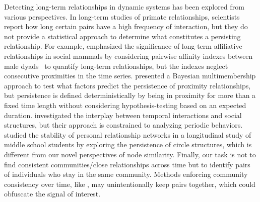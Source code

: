 \documentclass{article}
\theoremstyle{plain}
\theoremstyle{definition}
\theoremstyle{remark}
\begin{document}
Detecting long-term relationships in dynamic systems has been explored from various perspectives. In long-term studies of primate relationships, scientists report how long certain pairs have a high frequency of interaction, but they do not provide a statistical approach to determine what constitutes a persisting relationship. For example,  \citet{mitani2009male} emphasized the significance of long-term affiliative relationships in social mammals by considering pairwise affinity indexes between male dyads~\cite{pepper1999general} to quantify long-term relationships, but the indexes neglect consecutive proximities in the time series. \citet{derby2024female} presented a Bayesian multimembership approach to test what factors predict the persistence of proximity relationships, but persistence is defined deterministically by being in proximity for more than a fixed time length without considering hypothesis-testing based on an expected duration. \citet{qin2019mining} investigated the interplay between temporal interactions and social structures, but their approach is constrained to analyzing periodic behaviors. \citet{escribano2023stability} studied the stability of personal relationship networks in a longitudinal study of middle school students by exploring the persistence of circle structures, which is different from our novel perspectives of node similarity. Finally, our task is not to find consistent communities/close relationships across time but to identify pairs of individuals who stay in the same community. Methods enforcing community consistency over time, like \citet{mucha2010community}, may unintentionally keep pairs together, which could obfuscate the signal of interest. 
\end{document}
